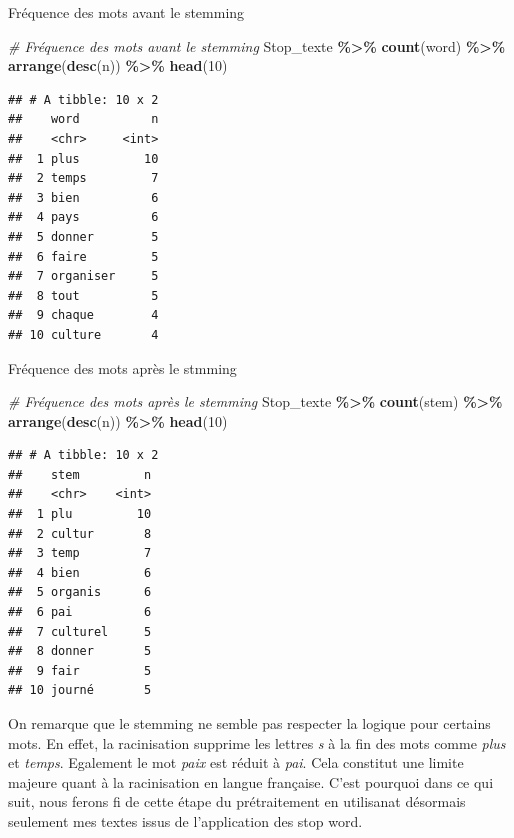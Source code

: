 \documentclass[
]{article}
\newenvironment{Shaded}{\begin{snugshade}}{\end{snugshade}}
\newcommand{\CommentTok}[1]{\textcolor[rgb]{0.56,0.35,0.01}{\textit{#1}}}
\newcommand{\DecValTok}[1]{\textcolor[rgb]{0.00,0.00,0.81}{#1}}
\newcommand{\FunctionTok}[1]{\textcolor[rgb]{0.13,0.29,0.53}{\textbf{#1}}}
\newcommand{\NormalTok}[1]{#1}
\newcommand{\SpecialCharTok}[1]{\textcolor[rgb]{0.81,0.36,0.00}{\textbf{#1}}}
\begin{document}
Fréquence des mots avant le stemming

\begin{Shaded}
\begin{Highlighting}[]
\CommentTok{\# Fréquence des mots avant le stemming}
\NormalTok{Stop\_texte }\SpecialCharTok{\%\textgreater{}\%}
  \FunctionTok{count}\NormalTok{(word) }\SpecialCharTok{\%\textgreater{}\%}
  \FunctionTok{arrange}\NormalTok{(}\FunctionTok{desc}\NormalTok{(n)) }\SpecialCharTok{\%\textgreater{}\%}
  \FunctionTok{head}\NormalTok{(}\DecValTok{10}\NormalTok{)}
\end{Highlighting}
\end{Shaded}

\begin{verbatim}
## # A tibble: 10 x 2
##    word          n
##    <chr>     <int>
##  1 plus         10
##  2 temps         7
##  3 bien          6
##  4 pays          6
##  5 donner        5
##  6 faire         5
##  7 organiser     5
##  8 tout          5
##  9 chaque        4
## 10 culture       4
\end{verbatim}

Fréquence des mots après le stmming

\begin{Shaded}
\begin{Highlighting}[]
\CommentTok{\# Fréquence des mots après le stemming}
\NormalTok{Stop\_texte }\SpecialCharTok{\%\textgreater{}\%}
  \FunctionTok{count}\NormalTok{(stem) }\SpecialCharTok{\%\textgreater{}\%}
  \FunctionTok{arrange}\NormalTok{(}\FunctionTok{desc}\NormalTok{(n)) }\SpecialCharTok{\%\textgreater{}\%}
  \FunctionTok{head}\NormalTok{(}\DecValTok{10}\NormalTok{)}
\end{Highlighting}
\end{Shaded}

\begin{verbatim}
## # A tibble: 10 x 2
##    stem         n
##    <chr>    <int>
##  1 plu         10
##  2 cultur       8
##  3 temp         7
##  4 bien         6
##  5 organis      6
##  6 pai          6
##  7 culturel     5
##  8 donner       5
##  9 fair         5
## 10 journé       5
\end{verbatim}

On remarque que le stemming ne semble pas respecter la logique pour
certains mots. En effet, la racinisation supprime les lettres \emph{s} à
la fin des mots comme \emph{plus} et \emph{temps}. Egalement le mot
\emph{paix} est réduit à \emph{pai}. Cela constitut une limite majeure
quant à la racinisation en langue française. C'est pourquoi dans ce qui
suit, nous ferons fi de cette étape du prétraitement en utilisanat
désormais seulement mes textes issus de l'application des stop word.
\end{document}
